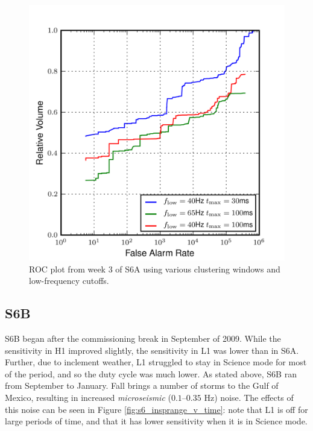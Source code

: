 \begin{figure}[p]
\label{fig:roc_cluster_windows}
\center
\includegraphics[width=5in]{figures/s6_clusterwin_investigation/s6week3cat4_ROC.png}
\caption{ROC plot from week 3 of S6A using various clustering windows and low-frequency cutoffs.}
\end{figure}

\subsection{S6B}
\label{sec:s6b}

S6B began after the commissioning break in September of 2009. While the
sensitivity in H1 improved slightly, the sensitivity in L1 was lower than in
S6A. Further, due to inclement weather, L1 struggled to stay in Science mode
for most of the period, and so the duty cycle was much lower. As stated above,
S6B ran from September to January. Fall brings a number of storms to the Gulf
of Mexico, resulting in increased \emph{microseismic} ($0.1$--$0.35$ Hz) noise.
The effects of this noise can be seen in Figure \ref{fig:s6_insprange_v_time}:
note that L1 is off for large periods of time, and that it has lower
sensitivity when it is in Science mode.

